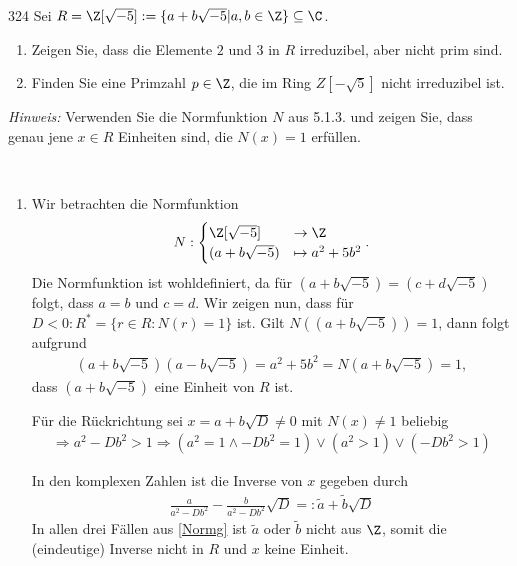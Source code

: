 \begin{algebraUE}{324}
Sei $R = \Z[\sqrt{-5}] := \{a + b\sqrt{-5} | a,b \in \Z\} \subseteq \C$.
\begin{enumerate}
  \item Zeigen Sie, dass die Elemente $2$ und $3$ in $R$ irreduzibel, aber nicht prim
  sind.
  \item Finden Sie eine Primzahl $p \in \Z$, die im Ring $Z[-\sqrt{5}]$ nicht irreduzibel ist.
\end{enumerate}
\textit{Hinweis:} Verwenden Sie die Normfunktion $N$ aus 5.1.3. und zeigen Sie,
dass genau jene $x \in R$ Einheiten sind, die $N(x) = 1$ erfüllen.
\end{algebraUE}
\begin{solution}
\leavevmode \\
\begin{enumerate}
  \item Wir betrachten die Normfunktion
  \begin{align*}
    N: \begin{cases}
      \Z[\sqrt{-5}] &\to \Z \\
      (a + b\sqrt{-5}) &\mapsto a^2 + 5b^2
    \end{cases}.
  \end{align*}
  Die Normfunktion ist wohldefiniert, da für $(a + b\sqrt{-5}) = (c + d\sqrt{-5})$
  folgt, dass $a = b$ und $c = d$.
  Wir zeigen nun, dass für $D < 0: R^* = \{r \in R: N(r) = 1\}$ ist.
  Gilt $N((a + b\sqrt{-5}) ) = 1$, dann folgt aufgrund
  \begin{align*}
    (a + b\sqrt{-5})(a - b\sqrt{-5}) = a^2 + 5b^2 = N(a + b\sqrt{-5}) = 1,
  \end{align*}
  dass $(a + b\sqrt{-5})$ eine Einheit von $R$ ist.

  Für die Rückrichtung sei $x = a + b\sqrt{D} \neq 0$ mit $N(x) \neq 1$ beliebig
  \begin{align}\label{Normg}
    \Rightarrow a^2 - D b^2 > 1 \Rightarrow (a^2=1 \land -Db^2 = 1) \lor (a^2 > 1) \lor (-Db^2 > 1)
  \end{align}

  In den komplexen Zahlen ist die Inverse von $x$ gegeben durch
  \begin{align*}
    \frac{a}{a^2 - Db^2} - \frac{b}{a^2-Db^2}\sqrt{D} =: \tilde{a} + \tilde{b} \sqrt{D}
  \end{align*}
  In allen drei Fällen aus \eqref{Normg} ist $\tilde{a}$ oder $\tilde{b}$ nicht aus $\Z$, somit die (eindeutige) Inverse nicht in $R$ und $x$ keine Einheit.


\end{enumerate}
\end{solution}
